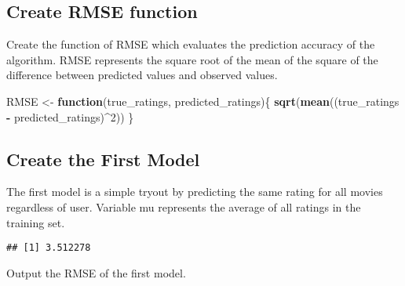 \documentclass[]{article}
\newenvironment{Shaded}{\begin{snugshade}}{\end{snugshade}}
\newcommand{\KeywordTok}[1]{\textcolor[rgb]{0.13,0.29,0.53}{\textbf{#1}}}
\newcommand{\DecValTok}[1]{\textcolor[rgb]{0.00,0.00,0.81}{#1}}
\newcommand{\StringTok}[1]{\textcolor[rgb]{0.31,0.60,0.02}{#1}}
\newcommand{\ControlFlowTok}[1]{\textcolor[rgb]{0.13,0.29,0.53}{\textbf{#1}}}
\newcommand{\OperatorTok}[1]{\textcolor[rgb]{0.81,0.36,0.00}{\textbf{#1}}}
\newcommand{\NormalTok}[1]{#1}
\begin{document}
\subsection{Create RMSE function}\label{create-rmse-function}

Create the function of RMSE which evaluates the prediction accuracy of
the algorithm. RMSE represents the square root of the mean of the square
of the difference between predicted values and observed values.

\begin{Shaded}
\begin{Highlighting}[]
\NormalTok{RMSE <-}\StringTok{ }\ControlFlowTok{function}\NormalTok{(true_ratings, predicted_ratings)\{}
  \KeywordTok{sqrt}\NormalTok{(}\KeywordTok{mean}\NormalTok{((true_ratings }\OperatorTok{-}\StringTok{ }\NormalTok{predicted_ratings)}\OperatorTok{^}\DecValTok{2}\NormalTok{))}
\NormalTok{\}}
\end{Highlighting}
\end{Shaded}

\subsection{Create the First Model}\label{create-the-first-model}

The first model is a simple tryout by predicting the same rating for all
movies regardless of user. Variable mu represents the average of all
ratings in the training set.

\begin{Shaded}
\end{Shaded}

\begin{verbatim}
## [1] 3.512278
\end{verbatim}

Output the RMSE of the first model.

\begin{Shaded}
\end{Shaded}
\end{document}
